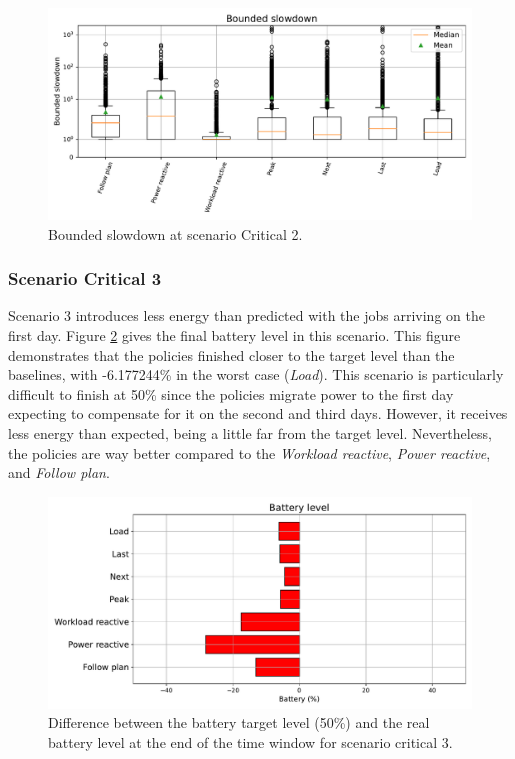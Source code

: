 \begin{figure}[!htb]
    \centering
    \includegraphics[scale=0.55]{Images/Compensations/slowdown_critical_2.pdf}
    \caption{Bounded slowdown at scenario Critical 2.}
    \label{fig:slowdown_critical_2}
\end{figure}

\clearpage

\subsubsection{Scenario Critical 3}
Scenario 3 introduces less energy than predicted with the jobs arriving on the first day. Figure \ref{fig:SoC_critical_3} gives the final battery level in this scenario. This figure demonstrates that the policies finished closer to the target level than the baselines, with -6.177244\% in the worst case (\emph{Load}). This scenario is particularly difficult to finish at 50\% since the policies migrate power to the first day expecting to compensate for it on the second and third days. However, it receives less energy than expected, being a little far from the target level. Nevertheless, the policies are way better compared to the \emph{Workload reactive}, \emph{Power reactive}, and \emph{Follow plan}.

\begin{figure}[!htb]
    \centering
    \includegraphics[scale=0.55]{Images/Compensations/battery_critical_3.pdf}
    \caption{Difference between the battery target level (50\%) and the real battery level at the end of the time window for scenario critical 3.}
    \label{fig:SoC_critical_3}
\end{figure}

